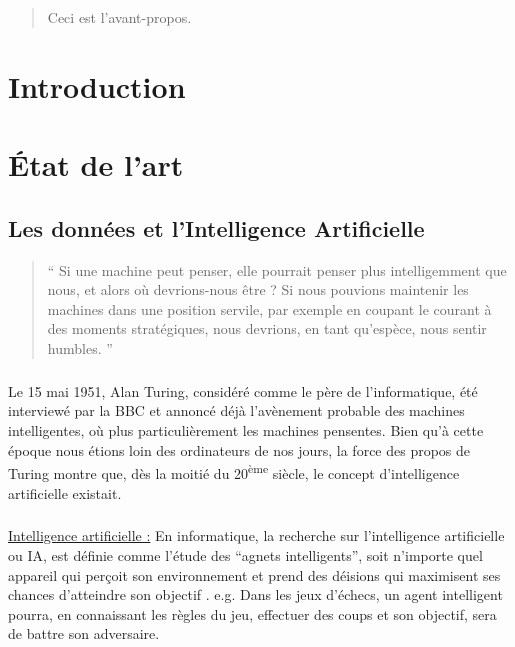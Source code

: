 \documentclass[10pt, french, a4paper]{report}
\begin{document}
\newpage
\setcounter{tocdepth}{3}
\tableofcontents

\newpage
\begin{abstract}

    Ceci est l'avant-propos.

\end{abstract}


\newpage
\chapter*{Introduction}


\chapter{\uppercase{é}tat de l'art}

\section{Les données et l'Intelligence Artificielle}

\begin{quotation}
  `` Si une machine peut penser, elle pourrait penser plus intelligemment que nous, et alors où devrions-nous être ? Si nous pouvions maintenir les machines dans une position servile, par exemple en coupant le courant à des moments stratégiques, nous devrions, en tant qu'espèce, nous sentir humbles. ''
\end{quotation}

\paragraph{}
Le 15 mai 1951, Alan Turing, considéré comme le père de l'informatique, été interviewé par la BBC et annoncé déjà l'avènement probable des machines intelligentes, où plus particulièrement les machines pensentes. Bien qu'à cette époque nous étions loin des ordinateurs de nos jours, la force des propos de Turing montre que, dès la moitié du 20\textsuperscript{ème} siècle, le concept d'intelligence artificielle existait.

\paragraph{}
\underline{Intelligence artificielle :} En informatique, la recherche sur l'intelligence artificielle ou IA, est définie comme l'étude des ``agnets intelligents'', soit n'importe quel appareil qui perçoit son environnement et prend des déisions qui maximisent ses chances d'atteindre son objectif \citep{poole_computational_1997}. e.g. Dans les jeux d’échecs, un agent intelligent pourra, en connaissant les règles du jeu, effectuer des coups et son objectif, sera de battre son adversaire.
\end{document}
